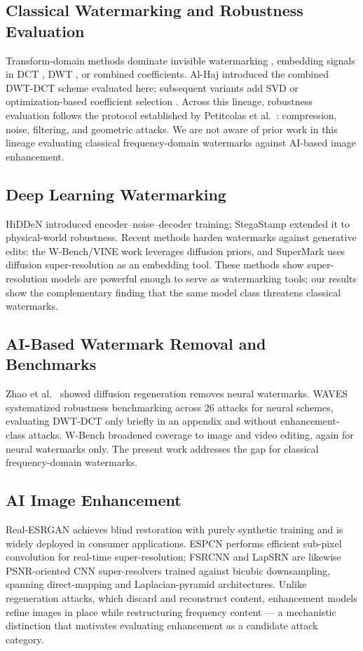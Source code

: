 \documentclass[conference]{IEEEtran}
\begin{document}
\subsection{Classical Watermarking and Robustness Evaluation}
Transform-domain methods dominate invisible watermarking \cite{cox2007},
embedding signals in DCT \cite{piva1997}, DWT \cite{barni2001}, or
combined coefficients. Al-Haj \cite{alhaj2007} introduced the combined
DWT-DCT scheme evaluated here; subsequent variants add SVD \cite{navas2008}
or optimization-based coefficient selection \cite{rijati2025}. Across
this lineage, robustness evaluation follows the protocol established
by Petitcolas et al.~\cite{petitcolas1998}: compression, noise,
filtering, and geometric attacks. We are not aware of prior work in this
lineage evaluating classical frequency-domain watermarks against AI-based
image enhancement.

\subsection{Deep Learning Watermarking}
HiDDeN \cite{hidden2018} introduced encoder--noise--decoder training;
StegaStamp \cite{stegastamp2020} extended it to physical-world
robustness. Recent methods harden watermarks against generative edits:
the W-Bench/VINE work \cite{wbench2024} leverages diffusion priors, and
SuperMark \cite{supermark2024} uses diffusion super-resolution as an
embedding tool. These methods show super-resolution models are powerful
enough to serve as watermarking tools; our results show the complementary
finding that the same model class threatens classical watermarks.

\subsection{AI-Based Watermark Removal and Benchmarks}
Zhao et al.~\cite{zhao2023} showed diffusion regeneration removes neural
watermarks. WAVES \cite{waves2024} systematized robustness benchmarking
across 26 attacks for neural schemes, evaluating DWT-DCT only briefly in
an appendix and without enhancement-class attacks. W-Bench
\cite{wbench2024} broadened coverage to image and video editing, again
for neural watermarks only. The present work addresses the gap for
classical frequency-domain watermarks.

\subsection{AI Image Enhancement}
Real-ESRGAN \cite{realesrgan2021} achieves blind restoration with purely
synthetic training and is widely deployed in consumer applications. ESPCN
\cite{espcn2016} performs efficient sub-pixel convolution for real-time
super-resolution; FSRCNN \cite{fsrcnn2016} and LapSRN \cite{lapsrn2017}
are likewise PSNR-oriented CNN super-resolvers trained against bicubic
downsampling, spanning direct-mapping and Laplacian-pyramid
architectures. Unlike regeneration attacks, which discard and
reconstruct content, enhancement models refine images in place while
restructuring frequency content --- a mechanistic distinction that
motivates evaluating enhancement as a candidate attack category.
\end{document}
